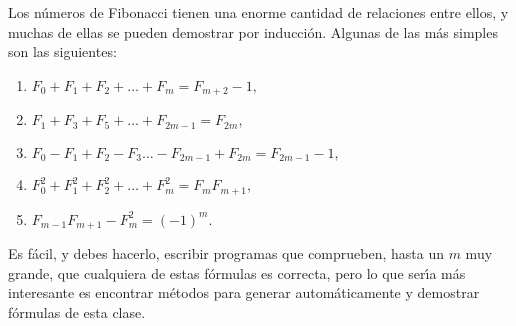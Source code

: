 Los n\'umeros de Fibonacci tienen una enorme cantidad de relaciones entre ellos,
y muchas de ellas se pueden demostrar por inducci\'on. Algunas de las m\'as
simples son las siguientes:

\begin{enumerate}
 \item\hfill $F_0+F_1+F_2+\dots+F_m=F_{m+2}-1,$\hfill\mbox{}

 \item\hfill $F_1+F_3+F_5+\dots+F_{2m-1}=F_{2m},$\hfill\mbox{}
 
 \item\hfill $F_0-F_1+F_2-F_3\dots-F_{2m-1}+F_{2m}=F_{2m-1}-1,$\hfill\mbox{}
 
 \item\hfill $F_0^2+F_1^2+F_2^2+\dots+F_m^2=F_{m}F_{m+1},$\hfill\mbox{}
 
 \item\hfill $F_{m-1}F_{m+1}-F_m^2=(-1)^m.$\hfill\mbox{}
 \end{enumerate}

 \begin{ejer}
Es f\'acil, y debes hacerlo,  escribir programas que comprueben, hasta un $m$
muy grande, que cualquiera de estas f\'ormulas es correcta, pero lo que
ser\'{\i}a m\'as interesante es encontrar m\'etodos para generar
autom\'aticamente y demostrar  f\'ormulas de esta clase.
\end{ejer}

